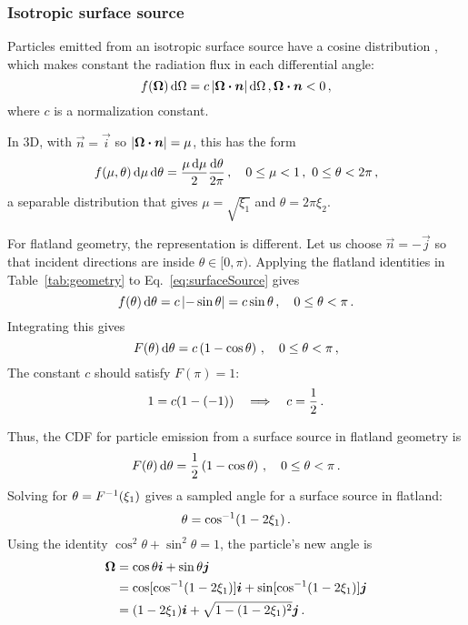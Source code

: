 \subsubsection{Isotropic surface source}
Particles emitted from an isotropic surface source have a cosine distribution
\cite{Gre2002}, which makes constant the radiation flux in each differential
angle:
\begin{equation}\label{eq:surfaceSource}
  f(\bm{\Omega}) \mathop{}\!\mathrm{d} \Omega = c \left| \bm{\Omega}\bm{\cdot} \bm{n} \right| \mathop{}\!\mathrm{d} \Omega \,,
\bm{\Omega}\bm{\cdot} \bm{n} < 0 \,,
\end{equation}
where $c$ is a normalization constant.

In 3D, with $\vec{n}=\vec{i}$ so $\left| \bm{\Omega}\bm{\cdot} \bm{n} \right|=\mu$, this has
the form
\begin{equation*}
  f(\mu, \theta) \mathop{}\!\mathrm{d}\mu \mathop{}\!\mathrm{d}\theta = \frac{\mu \mathop{}\!\mathrm{d}\mu}{2} \frac{\mathop{}\!\mathrm{d}\theta}{2\pi}
  \,,\quad 0 \le \mu < 1\,,\ 0 \le \theta < 2\pi\,,
\end{equation*}
a separable distribution that gives $\mu=\sqrt{\xi_1}$ and $\theta=2\pi \xi_2$.

For flatland geometry, the representation is different. Let us choose
$\vec{n} = -\vec{j}$ so that incident directions are inside
$\theta \in [0, \pi)$.
Applying the flatland identities in Table~\ref{tab:geometry} to
Eq.~\eqref{eq:surfaceSource} gives
\begin{equation*}
  f(\theta) \mathop{}\!\mathrm{d}\theta = c\left|  -\sin \theta \right|
  = c \sin \theta \,,\quad 0 \le \theta < \pi\,.
\end{equation*}
Integrating this gives
\begin{equation*}
  F(\theta) \mathop{}\!\mathrm{d}\theta = c \left( 1-\cos\theta \right)
  \,,\quad 0 \le \theta < \pi\,,
\end{equation*}
The constant $c$ should satisfy $F(\pi)=1$:
\begin{equation*}
  1 = c (1 - (-1) ) \quad \Longrightarrow \quad c=\frac{1}{2}\,.
\end{equation*}

Thus, the CDF for particle emission from a surface source in flatland geometry
is
\begin{equation*}
  F(\theta) \mathop{}\!\mathrm{d}\theta = \frac{1}{2} \left( 1-\cos\theta \right)
  \,,\quad 0 \le \theta < \pi\,.
\end{equation*}
Solving for $\theta = F^{-1}(\xi_1)$ gives a sampled angle for a surface source
in flatland:
\begin{equation*}
  \theta = \cos^{-1}(1 - 2\xi_1)\,.
\end{equation*}
Using the identity $\cos^2 \theta + \sin^2 \theta = 1$, the particle's new angle is
\begin{align*}
  \bm{\Omega} &= \cos \theta \bm{i} + \sin \theta \bm{j} \\
  &=  \cos[ \cos^{-1}(1 - 2\xi_1) ] \bm{i} + \sin[ \cos^{-1}(1 - 2\xi_1) ] \bm{j} \\
  &= (1 - 2\xi_1) \bm{i} + \sqrt{1 - (1 - 2\xi_1)^2} \bm{j}\,.
\end{align*}

